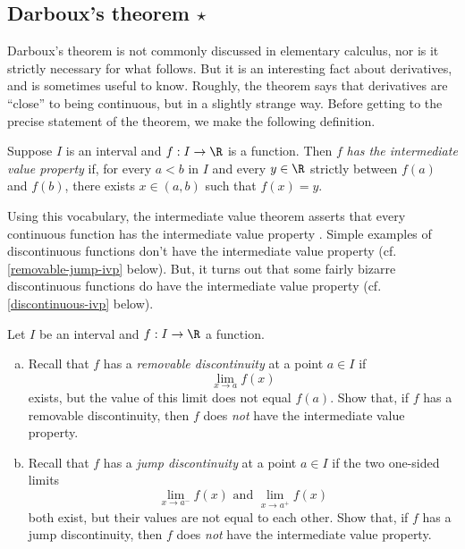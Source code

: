 \subsection{Darboux's theorem \texorpdfstring{$\star$}{*}} \label{darboux-section}

Darboux's theorem is not commonly discussed in elementary calculus, nor is it strictly necessary for what follows. But it is an interesting fact about derivatives, and is sometimes useful to know. Roughly, the theorem says that derivatives are ``close'' to being continuous, but in a slightly strange way. Before getting to the precise statement of the theorem, we make the following definition. 

\begin{definition}
	Suppose $I$ is an interval and $f : I \to \R$ is a function. Then $f$ \emph{has the intermediate value property} if, for every $a < b$ in $I$ and every $y \in \R$ strictly between $f(a)$ and $f(b)$, there exists $x \in (a, b)$ such that $f(x) = y$. 
\end{definition}

Using this vocabulary, the intermediate value theorem asserts that every continuous function has the intermediate value property \cite[theorem 3.3]{protter-morrey}. Simple examples of discontinuous functions don't have the intermediate value property (cf. \cref{removable-jump-ivp} below). But, it turns out that some fairly bizarre discontinuous functions do have the intermediate value property (cf. \cref{discontinuous-ivp} below). 

\begin{exercise} \label{removable-jump-ivp}
	Let $I$ be an interval and $f : I \to \R$ a function. 
	\begin{enumerate}[(a)]
		\item Recall that $f$ has a \emph{removable discontinuity} at a point $a \in I$ if
		\[ \lim_{x \to a} f(x) \]
		exists, but the value of this limit does not equal $f(a)$. Show that, if $f$ has a removable discontinuity, then $f$ does \emph{not} have the intermediate value property. 
		 
		\item Recall that $f$ has a \emph{jump discontinuity} at a point $a \in I$ if the two one-sided limits
		\[ \lim_{x \to a^-} f(x) \text{ and } \lim_{x \to a^+} f(x) \]
		both exist, but their values are not equal to each other. Show that, if $f$ has a jump discontinuity, then $f$ does \emph{not} have the intermediate value property.  
	\end{enumerate}
\end{exercise}

